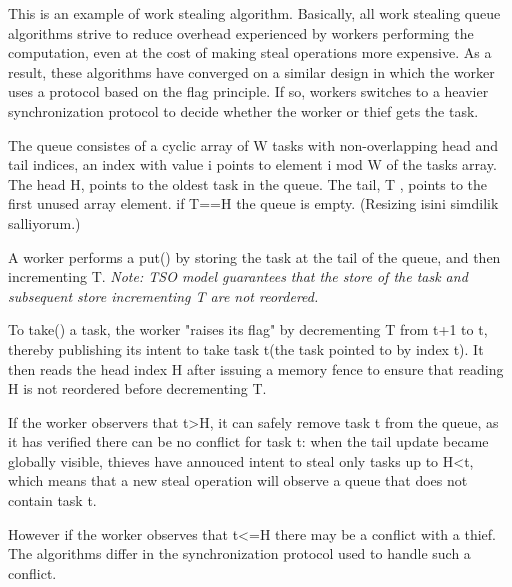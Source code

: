 \documentclass[a4paper]{article}
\begin{document}

This is an example of work stealing algorithm. Basically, all work stealing queue algorithms strive to reduce overhead experienced by workers performing the computation, even at the cost of making steal operations more expensive.  As a result, these algorithms have converged on a similar design in which the worker uses a protocol based on the flag principle. If so, workers switches to a heavier synchronization protocol to decide whether the worker or thief gets the task.

The queue consistes of a cyclic array of W tasks with non-overlapping head and tail indices, an index with value i points to element i mod W of the tasks array. The head H, points to the oldest task in the queue. The tail, T , points to the first unused array element. if T==H the queue is empty. (Resizing isini simdilik salliyorum.)

A worker performs a put() by storing the task at the tail of the queue, and then incrementing T. \textit{Note: TSO model guarantees that the store of the task and subsequent store incrementing T are not reordered.}

To take() a task, the worker "raises its flag" by decrementing T from t+1 to t, thereby publishing its intent to take task t(the task pointed to by index t). It then reads the head index H after issuing a memory fence to ensure that reading H is not reordered before decrementing T.

If the worker observers that t>H, it can safely remove task t from the queue, as it has verified there can be no conflict for task t: when the tail update became globally visible, thieves have annouced intent to steal only tasks up to H<t, which means that a new steal operation will observe a queue that does not contain task t.

However if the worker observes that t<=H there may be a conflict with a thief. The algorithms differ in the synchronization protocol used to handle such a conflict.
\end{document}
